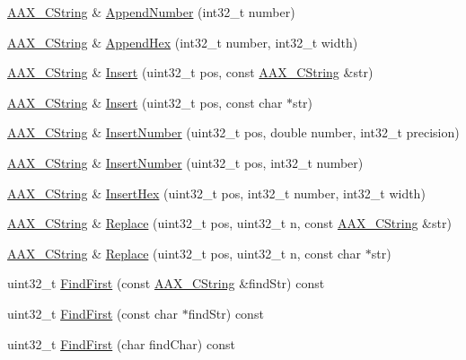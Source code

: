 \begin{DoxyCompactItemize}
\item 
\mbox{\hyperlink{a01573}{A\+A\+X\+\_\+\+C\+String}} \& \mbox{\hyperlink{a01573_a786e1ba24a2b7a893d1716884e887ef2}{Append\+Number}} (int32\+\_\+t number)
\item 
\mbox{\hyperlink{a01573}{A\+A\+X\+\_\+\+C\+String}} \& \mbox{\hyperlink{a01573_a245305cf7cea6f5ba710bdbf7803b535}{Append\+Hex}} (int32\+\_\+t number, int32\+\_\+t width)
\item 
\mbox{\hyperlink{a01573}{A\+A\+X\+\_\+\+C\+String}} \& \mbox{\hyperlink{a01573_ac75c6fa9a9feca688723726752e276ef}{Insert}} (uint32\+\_\+t pos, const \mbox{\hyperlink{a01573}{A\+A\+X\+\_\+\+C\+String}} \&str)
\item 
\mbox{\hyperlink{a01573}{A\+A\+X\+\_\+\+C\+String}} \& \mbox{\hyperlink{a01573_a5a5feb73f4187fddc7da0d1d8d821468}{Insert}} (uint32\+\_\+t pos, const char $\ast$str)
\item 
\mbox{\hyperlink{a01573}{A\+A\+X\+\_\+\+C\+String}} \& \mbox{\hyperlink{a01573_a4657b3b7b319a76dc6e0a2c0fd9f15f1}{Insert\+Number}} (uint32\+\_\+t pos, double number, int32\+\_\+t precision)
\item 
\mbox{\hyperlink{a01573}{A\+A\+X\+\_\+\+C\+String}} \& \mbox{\hyperlink{a01573_a75f4b0d92de2f70405a115ff32546d99}{Insert\+Number}} (uint32\+\_\+t pos, int32\+\_\+t number)
\item 
\mbox{\hyperlink{a01573}{A\+A\+X\+\_\+\+C\+String}} \& \mbox{\hyperlink{a01573_a997f5d35fe26da01fcd895d642a93c2e}{Insert\+Hex}} (uint32\+\_\+t pos, int32\+\_\+t number, int32\+\_\+t width)
\item 
\mbox{\hyperlink{a01573}{A\+A\+X\+\_\+\+C\+String}} \& \mbox{\hyperlink{a01573_a5c9ce66b740633bf47505a3129e557c2}{Replace}} (uint32\+\_\+t pos, uint32\+\_\+t n, const \mbox{\hyperlink{a01573}{A\+A\+X\+\_\+\+C\+String}} \&str)
\item 
\mbox{\hyperlink{a01573}{A\+A\+X\+\_\+\+C\+String}} \& \mbox{\hyperlink{a01573_a0042478ce045fd36b91a7cfc1122ffb6}{Replace}} (uint32\+\_\+t pos, uint32\+\_\+t n, const char $\ast$str)
\item 
uint32\+\_\+t \mbox{\hyperlink{a01573_ab748c054c346f7ea863b51cea4fc52cb}{Find\+First}} (const \mbox{\hyperlink{a01573}{A\+A\+X\+\_\+\+C\+String}} \&find\+Str) const
\item 
uint32\+\_\+t \mbox{\hyperlink{a01573_ae4f44312e8e2e57e268974e0849ad48c}{Find\+First}} (const char $\ast$find\+Str) const
\item 
uint32\+\_\+t \mbox{\hyperlink{a01573_a5af7f56b71f9b5a7d30d71b65bc30f87}{Find\+First}} (char find\+Char) const

\end{DoxyCompactItemize}
